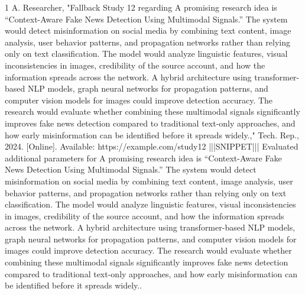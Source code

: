 \documentclass[conference]{IEEEtran}
\begin{document}
\begin{thebibliography}{1}
A. Researcher, "Fallback Study 12 regarding A promising research idea is “Context-Aware Fake News Detection Using Multimodal Signals.” The system would detect misinformation on social media by combining text content, image analysis, user behavior patterns, and propagation networks rather than relying only on text classification. The model would analyze linguistic features, visual inconsistencies in images, credibility of the source account, and how the information spreads across the network. A hybrid architecture using transformer-based NLP models, graph neural networks for propagation patterns, and computer vision models for images could improve detection accuracy. The research would evaluate whether combining these multimodal signals significantly improves fake news detection compared to traditional text-only approaches, and how early misinformation can be identified before it spreads widely.," Tech. Rep., 2024. [Online]. Available: https://example.com/study12 |||SNIPPET||| Evaluated additional parameters for A promising research idea is “Context-Aware Fake News Detection Using Multimodal Signals.” The system would detect misinformation on social media by combining text content, image analysis, user behavior patterns, and propagation networks rather than relying only on text classification. The model would analyze linguistic features, visual inconsistencies in images, credibility of the source account, and how the information spreads across the network. A hybrid architecture using transformer-based NLP models, graph neural networks for propagation patterns, and computer vision models for images could improve detection accuracy. The research would evaluate whether combining these multimodal signals significantly improves fake news detection compared to traditional text-only approaches, and how early misinformation can be identified before it spreads widely..

\end{thebibliography}
\end{document}
